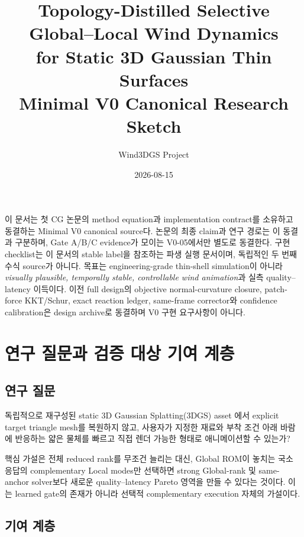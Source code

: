 \documentclass[11pt]{article}
\title{\textbf{Topology-Distilled Selective Global--Local Wind Dynamics}\\
for Static 3D Gaussian Thin Surfaces\\[0.35em]
\large Minimal V0 Canonical Research Sketch}
\author{Wind3DGS Project}
\date{2026-08-15}
\begin{document}
\maketitle

\begin{tcolorbox}[colback=CoreLight,colframe=CoreBlue,title=Canonical method/contract freeze,fonttitle=\bfseries]
이 문서는 첫 CG 논문의 method equation과 implementation contract를 소유하고 동결하는
Minimal V0 canonical source다. 논문의 최종 claim과 연구 경로는 이 동결과 구분하며,
Gate A/B/C evidence가 모이는 V0-05에서만 별도로 동결한다.
구현 checklist는 이 문서의 stable label을 참조하는 파생 실행 문서이며,
독립적인 두 번째 수식 source가 아니다.
목표는 engineering-grade thin-shell simulation이 아니라
\emph{visually plausible, temporally stable, controllable wind animation}과
실측 quality--latency 이득이다.
이전 full design의 objective normal-curvature closure, patch-force KKT/Schur,
exact reaction ledger, same-frame corrector와 confidence calibration은
design archive로 동결하며 V0 구현 요구사항이 아니다.
\end{tcolorbox}

\tableofcontents
\newpage

\section{연구 질문과 검증 대상 기여 계층}

\subsection{연구 질문}

독립적으로 재구성된 static 3D Gaussian Splatting(3DGS) asset
\cite{kerbl2023gaussian}에서 explicit target triangle mesh를 복원하지 않고,
사용자가 지정한 재료와 부착 조건 아래 바람에 반응하는 얇은 물체를
빠르고 직접 렌더 가능한 형태로 애니메이션할 수 있는가?

핵심 가설은 전체 reduced rank를 무조건 늘리는 대신, Global ROM이 놓치는
국소 응답의 complementary Local modes만 선택하면 strong Global-rank 및
same-anchor solver보다 새로운 quality--latency Pareto 영역을 만들 수 있다는 것이다.
이는 learned gate의 존재가 아니라 선택적 complementary execution 자체의 가설이다.

\subsection{기여 계층}
\end{document}
